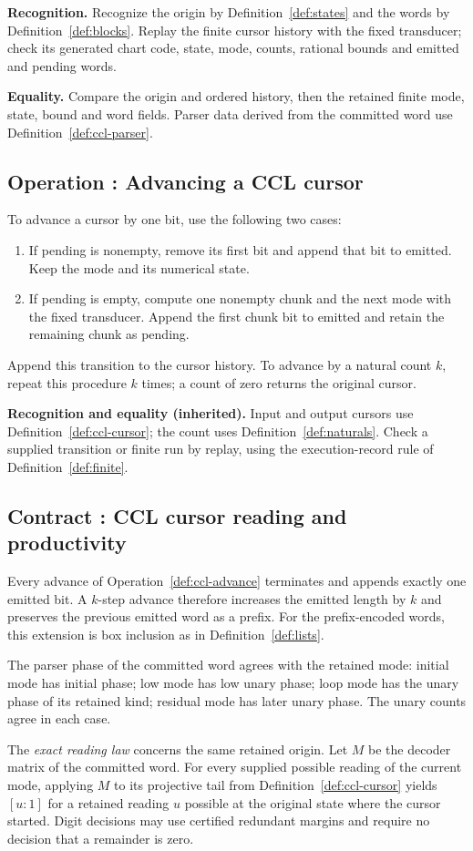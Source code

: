 \documentclass[11pt]{article}
\newcounter{definition}
\newcommand{\entry}[2]{%
  \refstepcounter{definition}\subsection*{#1 \thedefinition: #2}}
\newcommand{\contract}[1]{\entry{Contract}{#1}}
\newcommand{\operation}[1]{\entry{Operation}{#1}}
\newcommand{\checks}[2]{\begin{samepage}\par
  \textbf{Recognition.} #1\par\nopagebreak[4]
  \textbf{Equality.} #2\par\end{samepage}}
\newcommand{\inheritedchecks}[1]{\par
  \textbf{Recognition and equality (inherited).} #1\par}
\begin{document}
\checks{Recognize the origin by Definition~\ref{def:states} and the
words by Definition~\ref{def:blocks}. Replay the finite cursor history
with the fixed transducer; check its generated chart code, state, mode,
counts, rational bounds and emitted and pending words.}
{Compare the origin and ordered history, then the retained finite mode,
state, bound and word fields. Parser data derived from the committed word
use Definition~\ref{def:ccl-parser}.}

\operation{Advancing a CCL cursor}\label{def:ccl-advance}
To advance a cursor by one bit, use the following two cases:
\begin{enumerate}
\item If pending is nonempty, remove its first bit and append that bit
to emitted. Keep the mode and its numerical state.
\item If pending is empty, compute one nonempty chunk and the next mode
with the fixed transducer. Append the first chunk bit to emitted and
retain the remaining chunk as pending.
\end{enumerate}
Append this transition to the cursor history. To advance by a natural
count $k$, repeat this procedure $k$ times; a count of zero returns the
original cursor.

\inheritedchecks{Input and output cursors use
Definition~\ref{def:ccl-cursor}; the count uses
Definition~\ref{def:naturals}. Check a supplied transition or finite run
by replay, using the execution-record rule of Definition~\ref{def:finite}.}

\contract{CCL cursor reading and productivity}\label{def:ccl-reading}
Every advance of Operation~\ref{def:ccl-advance} terminates and appends
exactly one emitted bit. A $k$-step advance therefore increases the emitted
length by $k$ and preserves the previous emitted word as a prefix.
For the prefix-encoded words, this extension is box inclusion as in
Definition~\ref{def:lists}.

The parser phase of the committed word agrees with the retained mode:
initial mode has initial phase; low mode has low unary phase; loop mode
has the unary phase of its retained kind; residual mode has later unary
phase. The unary counts agree in each case.

The \emph{exact reading law} concerns the same retained origin.
Let $M$ be the decoder matrix of the committed word. For every supplied
possible reading of the current mode, applying $M$ to its projective tail
from Definition~\ref{def:ccl-cursor} yields $[u:1]$ for a retained reading
$u$ possible at the original state where the cursor started.
Digit decisions may use certified redundant margins and require no
decision that a remainder is zero.
\end{document}
